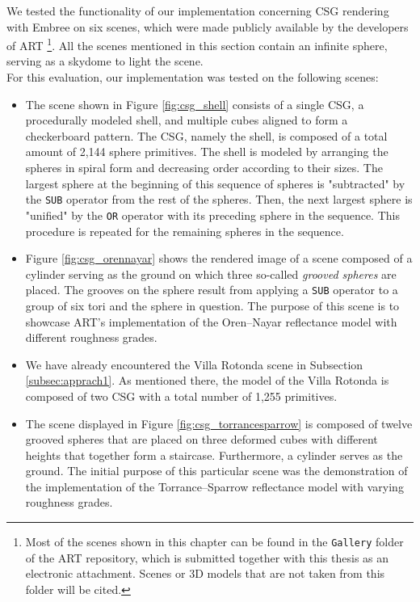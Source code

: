 We tested the functionality of our implementation concerning CSG rendering with Embree on six scenes, which were made publicly available by the developers of ART \footnote{Most of the scenes shown in this chapter can be found in the \texttt{Gallery} folder of the ART repository, which is submitted together with this thesis as an electronic attachment. Scenes or 3D models that are not taken from this folder will be cited.}. All the scenes mentioned in this section contain an infinite sphere, serving as a skydome to light the scene. 
\\

\noindent For this evaluation, our implementation was tested on the following scenes:
\begin{itemize}
	\setlength\itemsep{0.05em}
	
	\item The scene shown in Figure \ref{fig:csg_shell} consists of a single CSG, a procedurally modeled shell, and multiple cubes aligned to form a checkerboard pattern. The CSG, namely the shell, is composed of a total amount of 2,144 sphere primitives. The shell is modeled by arranging the spheres in spiral form and decreasing order according to their sizes. The largest sphere at the beginning of this sequence of spheres is "subtracted" by the \texttt{SUB} operator from the rest of the spheres. Then, the next largest sphere is "unified" by the \texttt{OR} operator with its preceding sphere in the sequence. This procedure is repeated for the remaining spheres in the sequence.
	
	\item  Figure \ref{fig:csg_orennayar} shows the rendered image of a scene composed of a cylinder serving as the ground on which three so-called \emph{grooved spheres} are placed. The grooves on the sphere result from applying a \texttt{SUB} operator to a group of six tori and the sphere in question.
	The purpose of this scene is to showcase ART's implementation of the Oren–Nayar reflectance model \cite{oren1994generalization} with different roughness grades.
	
	\item We have already encountered the Villa Rotonda scene in Subsection \ref{subsec:apprach1}. As mentioned there, the model of the Villa Rotonda is composed of two CSG with a total number of 1,255 primitives.
		
	\item The scene displayed in Figure \ref{fig:csg_torrancesparrow} is composed of twelve grooved spheres that are placed on three deformed cubes with different heights that together form a staircase. Furthermore, a cylinder serves as the ground. The initial purpose of this particular scene was the demonstration of the implementation of the Torrance–Sparrow reflectance model \cite{torrance1967theory} with varying roughness grades.
	

\end{itemize}
